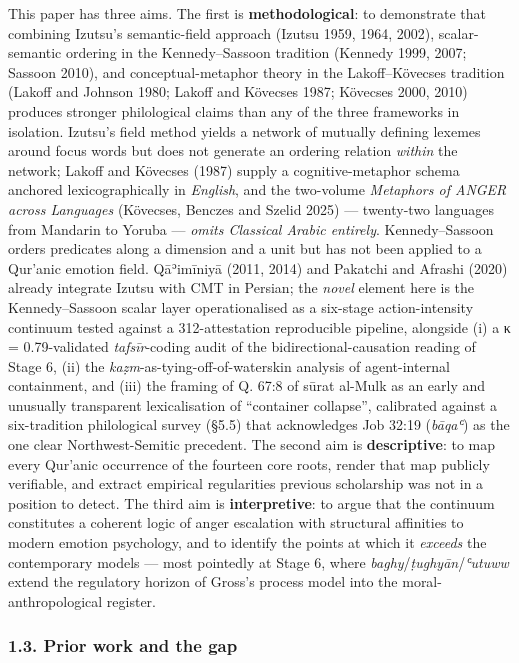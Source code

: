 This paper has three aims. The first is \textbf{methodological}: to
demonstrate that combining Izutsu's semantic-field approach (Izutsu
1959, 1964, 2002), scalar-semantic ordering in the Kennedy--Sassoon
tradition (Kennedy 1999, 2007; Sassoon 2010), and conceptual-metaphor
theory in the Lakoff--Kövecses tradition (Lakoff and Johnson 1980;
Lakoff and Kövecses 1987; Kövecses 2000, 2010) produces stronger
philological claims than any of the three frameworks in isolation.
Izutsu's field method yields a network of mutually defining lexemes
around focus words but does not generate an ordering relation
\emph{within} the network; Lakoff and Kövecses (1987) supply a
cognitive-metaphor schema anchored lexicographically in \emph{English},
and the two-volume \emph{Metaphors of ANGER across Languages} (Kövecses,
Benczes and Szelid 2025) --- twenty-two languages from Mandarin to
Yoruba --- \emph{omits Classical Arabic entirely}. Kennedy--Sassoon
orders predicates along a dimension and a unit but has not been applied
to a Qur'anic emotion field. Qāʾimīniyā (2011, 2014) and Pakatchi and
Afrashi (2020) already integrate Izutsu with CMT in Persian; the
\emph{novel} element here is the Kennedy--Sassoon scalar layer
operationalised as a six-stage action-intensity continuum tested against
a 312-attestation reproducible pipeline, alongside (i) a κ =
0.79-validated \emph{tafsīr}-coding audit of the bidirectional-causation
reading of Stage 6, (ii) the \emph{kaẓm}-as-tying-off-of-waterskin
analysis of agent-internal containment, and (iii) the framing of Q. 67:8
of sūrat al-Mulk as an early and unusually transparent lexicalisation of
``container collapse'', calibrated against a six-tradition philological
survey (§5.5) that acknowledges Job 32:19 (\emph{bāqaʿ}) as the one
clear Northwest-Semitic precedent. The second aim is
\textbf{descriptive}: to map every Qur'anic occurrence of the fourteen
core roots, render that map publicly verifiable, and extract empirical
regularities previous scholarship was not in a position to detect. The
third aim is \textbf{interpretive}: to argue that the continuum
constitutes a coherent logic of anger escalation with structural
affinities to modern emotion psychology, and to identify the points at
which it \emph{exceeds} the contemporary models --- most pointedly at
Stage 6, where \emph{baghy}/\emph{ṭughyān}/\emph{ʿutuww} extend the
regulatory horizon of Gross's process model into the
moral-anthropological register.

\subsubsection{1.3. Prior work and the
gap}\label{prior-work-and-the-gap}

